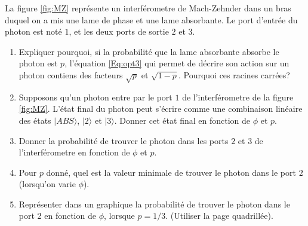 La figure \ref{fig:MZ} représente un interférometre de Mach-Zehnder dans un bras duquel on a mis une lame de phase et une lame absorbante.  Le port d'entrée du photon est noté $1$, et les deux ports de sortie $2$ et $3$.

\begin{enumerate}
\item Expliquer pourquoi, si la probabilité que la lame absorbante absorbe le photon est $p$, l'équation \eqref{Eq:opt3} qui permet de décrire son action sur un photon contiens des facteurs $\sqrt{p}$ et $\sqrt{1-p}$. Pourquoi ces racines carrées?

\item 
Supposons qu'un photon entre par le port $1$ de l'interférometre de la figure \ref{fig:MZ}. L'état final du photon peut s'écrire comme une combinaison linéaire des états $ \vert ABS \rangle $, $ \vert 2 \rangle $ et $ \vert 3 \rangle $. Donner cet état final en fonction de $\phi$ et $p$.

\item Donner la probabilité de trouver le photon dans les ports $2$ et $3$ de l'interférometre en  fonction de $\phi$ et $p$.

\item Pour $p$ donné, quel est la valeur minimale de trouver le photon dans le port $2$ (lorsqu'on varie $\phi$).

\item Représenter dans un graphique la probabilité de trouver le photon dans le port 2 en fonction de $\phi$, lorsque $p=1/3$. (Utiliser la page quadrillée).


\end{enumerate}

